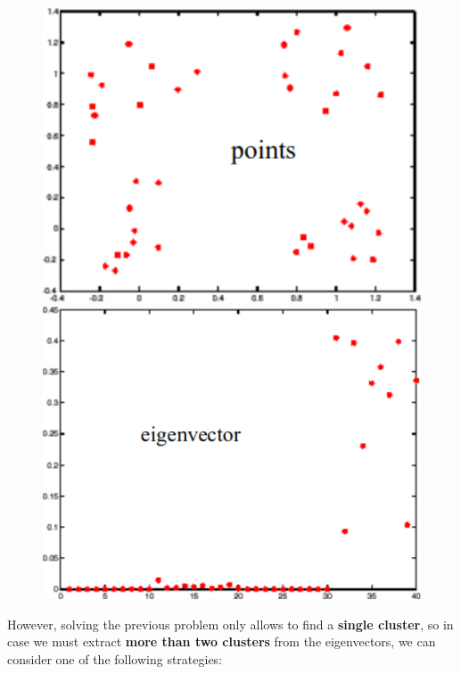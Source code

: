 \begin{figure}[H]
	\begin{minipage}[t]{0.49\linewidth} 
		\centering
		\includegraphics[width=1\textwidth]{img/eigenpoints}
	\end{minipage}        
	\hspace{1cm}
	\begin{minipage}[t]{0.49\linewidth} 
		\centering
		\includegraphics[width=1\textwidth]{img/eigenvectors}
	\end{minipage}
\end{figure}

However, solving the previous problem only allows to find a \textbf{single cluster}, so in case we must extract \textbf{more than two clusters} from the eigenvectors, we can consider one of the following strategies:

